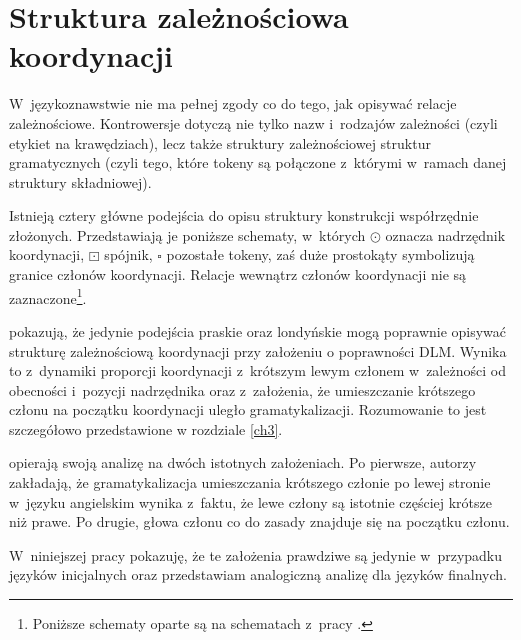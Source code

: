 \section{Struktura zależnościowa koordynacji}

W~językoznawstwie nie ma pełnej zgody co do tego, jak opisywać relacje zależnościowe. Kontrowersje dotyczą nie tylko nazw i~rodzajów zależności (czyli etykiet na krawędziach), lecz także struktury zależnościowej struktur gramatycznych (czyli tego, które tokeny są połączone z~którymi w~ramach danej struktury składniowej).

Istnieją cztery główne podejścia do opisu struktury konstrukcji współrzędnie złożonych. Przedstawiają je poniższe schematy, w~których $\odot$ oznacza nadrzędnik koordynacji, $\boxdot$ spójnik, $\square$ pozostałe tokeny, zaś duże prostokąty symbolizują granice członów koordynacji. Relacje wewnątrz członów koordynacji nie są zaznaczone\footnote{
Poniższe schematy oparte są na schematach  z~pracy \cite{przepiorkowski2023conjunct}.}.



\cite{przepiorkowski2023conjunct} pokazują, że jedynie podejścia praskie oraz londyńskie mogą poprawnie opisywać strukturę zależnościową koordynacji przy założeniu o poprawności DLM. Wynika to z~dynamiki proporcji koordynacji z~krótszym lewym członem w~zależności od obecności i~pozycji nadrzędnika oraz z~założenia, że umieszczanie krótszego członu na początku koordynacji uległo gramatykalizacji. Rozumowanie to jest szczegółowo przedstawione w rozdziale \ref{ch3}.

\cite{przepiorkowski2023conjunct} opierają swoją analizę na dwóch istotnych założeniach. Po pierwsze, autorzy zakładają, że gramatykalizacja umieszczania krótszego członie po lewej stronie w~języku angielskim wynika z~faktu, że lewe człony są istotnie częściej krótsze niż prawe. Po drugie, głowa członu co do zasady znajduje się na początku członu. 

W~niniejszej pracy pokazuję, że te założenia prawdziwe są jedynie w~przypadku języków inicjalnych oraz przedstawiam analogiczną analizę dla języków finalnych.

